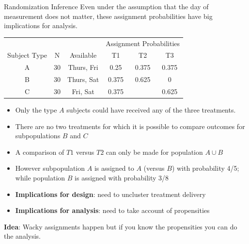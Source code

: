 \documentclass[
  11pt,
  ignorenonframetext,
]{beamer}
\begin{document}
\begin{frame}{Randomization Inference}
\protect\hypertarget{randomization-inference-6}{}
\footnotesize Even under the assumption that the day of measurement does
not matter, these assignment probabilities have big implications for
analysis.

\begin{table}\footnotesize
    \begin{tabular}{ccc|ccc}
          &       &       & \multicolumn{3}{|c}{Assignment Probabilities} \\
    Subject Type & N     & Available & T1    & T2    & T3 \\ \hline
    A     & 30    & Thurs, Fri & 0.25  & 0.375 & 0.375 \\
    B     & 30    & Thurs, Sat & 0.375 & 0.625 & 0 \\
    C     & 30    & Fri, Sat & 0.375 &       & 0.625 \\
    \end{tabular}
\end{table}

\begin{itemize}
\item
  Only the type \(A\) subjects could have received any of the three
  treatments.
\item
  There are no two treatments for which it is possible to compare
  outcomes for subpopulations \(B\) and \(C\)
\item
  A comparison of \(T1\) versus \(T2\) can only be made for population
  \(A \cup B\)
\item
  However subpopulation \(A\) is assigned to \(A\) (versus \(B\)) with
  probability 4/5; while population \(B\) is assigned with probability
  3/8
\item
  \textbf{Implications for design}: need to uncluster treatment delivery
\item
  \textbf{Implications for analysis}: need to take account of
  propensities
\end{itemize}

\textbf{Idea}: Wacky assignments happen but if you know the propensities
you can do the analysis.
\end{frame}
\end{document}
